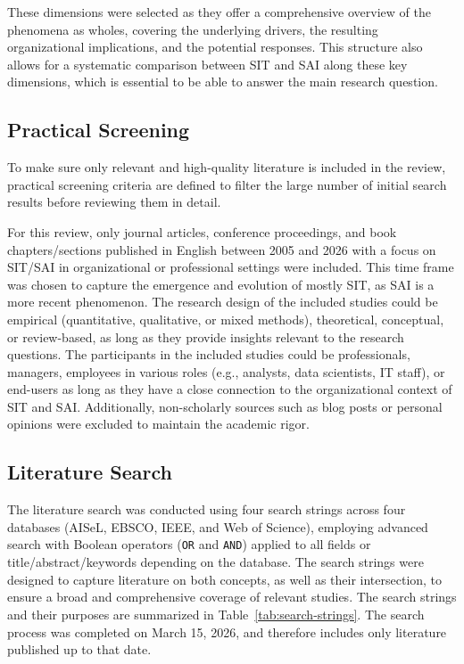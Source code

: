 \documentclass[12pt,oneside]{article}
\begin{document}
These dimensions were selected as they offer a comprehensive overview of the phenomena as wholes, covering the underlying drivers, the resulting organizational implications, and the potential responses. This structure also allows for a systematic comparison between \ac{SIT} and \ac{SAI} along these key dimensions, which is essential to be able to answer the main research question.

\subsection{Practical Screening} \label{practical-screening}

To make sure only relevant and high-quality literature is included in the review, practical screening criteria are defined to filter the large number of initial search results before reviewing them in detail.

For this review, only journal articles, conference proceedings, and book chapters/sections published in English between 2005 and 2026 with a focus on \ac{SIT}/\ac{SAI} in organizational or professional settings were included. This time frame was chosen to capture the emergence and evolution of mostly \ac{SIT}, as \ac{SAI} is a more recent phenomenon. The research design of the included studies could be empirical (quantitative, qualitative, or mixed methods), theoretical, conceptual, or review-based, as long as they provide insights relevant to the research questions. The participants in the included studies could be professionals, managers, employees in various roles (e.g., analysts, data scientists, \ac{IT} staff), or end-users as long as they have a close connection to the organizational context of \ac{SIT} and \ac{SAI}. Additionally, non-scholarly sources such as blog posts or personal opinions were excluded to maintain the academic rigor.

\subsection{Literature Search} \label{literature-search}

The literature search was conducted using four search strings across four databases (AISeL, EBSCO, IEEE, and Web of Science), employing advanced search with Boolean operators (\texttt{OR} and \texttt{AND}) applied to all fields or title/abstract/keywords depending on the database. The search strings were designed to capture literature on both concepts, as well as their intersection, to ensure a broad and comprehensive coverage of relevant studies. The search strings and their purposes are summarized in Table~\ref{tab:search-strings}. The search process was completed on March 15, 2026, and therefore includes only literature published up to that date.
\end{document}
